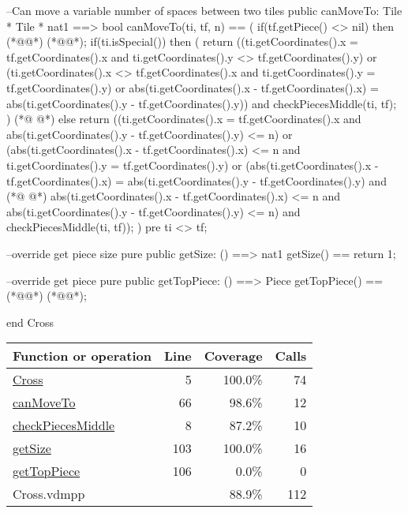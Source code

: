 \begin{vdmpp}[breaklines=true]
  --Can move a variable number of spaces between two tiles
  public canMoveTo: Tile * Tile * nat1 ==> bool
  canMoveTo(ti, tf, n) == (
   if(tf.getPiece() <> nil)
    then (*@@*) (*@@*);
   if(ti.isSpecial())
    then (
     return ((ti.getCoordinates().x = tf.getCoordinates().x and ti.getCoordinates().y <> tf.getCoordinates().y) or
          (ti.getCoordinates().x <> tf.getCoordinates().x and ti.getCoordinates().y = tf.getCoordinates().y) or 
         abs(ti.getCoordinates().x - tf.getCoordinates().x) = abs(ti.getCoordinates().y - tf.getCoordinates().y)) and
          checkPiecesMiddle(ti, tf);
    )
(*@
\label{getSize:103}
@*)
   else return ((ti.getCoordinates().x = tf.getCoordinates().x and abs(ti.getCoordinates().y - tf.getCoordinates().y) <= n) or
           (abs(ti.getCoordinates().x - tf.getCoordinates().x) <= n and ti.getCoordinates().y = tf.getCoordinates().y) or 
          (abs(ti.getCoordinates().x - tf.getCoordinates().x) = abs(ti.getCoordinates().y - tf.getCoordinates().y) and
(*@
\label{getTopPiece:106}
@*)
            abs(ti.getCoordinates().x - tf.getCoordinates().x) <= n and abs(ti.getCoordinates().y - tf.getCoordinates().y) <= n)
            and checkPiecesMiddle(ti, tf));
   )
  pre ti <> tf;
  
  --override get piece size
  pure public getSize: () ==> nat1
  getSize() == return 1;
  
  --override get piece
  pure public getTopPiece: () ==> Piece
  getTopPiece() == (*@@*) (*@@*);
  
end Cross
\end{vdmpp}
\bigskip
\begin{longtable}{|l|r|r|r|}
\hline
Function or operation & Line & Coverage & Calls \\
\hline
\hline
\hyperref[Cross:5]{Cross} & 5&100.0\% & 74 \\
\hline
\hyperref[canMoveTo:66]{canMoveTo} & 66&98.6\% & 12 \\
\hline
\hyperref[checkPiecesMiddle:8]{checkPiecesMiddle} & 8&87.2\% & 10 \\
\hline
\hyperref[getSize:103]{getSize} & 103&100.0\% & 16 \\
\hline
\hyperref[getTopPiece:106]{getTopPiece} & 106&0.0\% & 0 \\
\hline
\hline
Cross.vdmpp & & 88.9\% & 112 \\
\hline
\end{longtable}

